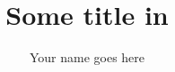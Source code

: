\documentclass[a4paper,11pt]{report}
\begin{document}
\title{Some title in \Compose*{}}
\author{Your name goes here}

\maketitle

\clearpage
{}%

%
%

\listoffixmes
\tableofcontents
\listoffigures
\lstlistoflistings
\printnomenclature[1in]

\clearpage
{}%






\end{document}
